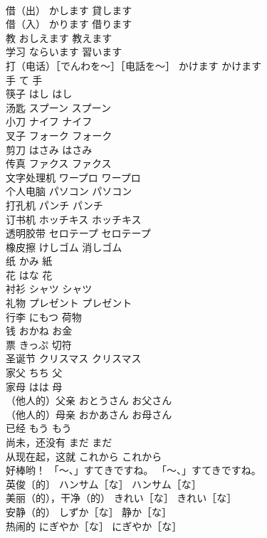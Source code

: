 \documentclass[8pt]{extreport}
\begin{document}
\begin{CJK}{UTF8}{min}
\\	借（出）	かします	貸します
\\	借（入）	かります	借ります
\\	教	おしえます	教えます
\\	学习	ならいます	習います
\\	打（电话）［でんわを～］［电話を～］	かけます	かけます
\\	手	て	手
\\	筷子	はし	はし
\\	汤匙	スプーン	スプーン
\\	小刀	ナイフ	ナイフ
\\	叉子	フォーク	フォーク
\\	剪刀	はさみ	はさみ
\\	传真	ファクス	ファクス
\\	文字处理机	ワープロ	ワープロ
\\	个人电脑	パソコン	パソコン
\\	打孔机	パンチ	パンチ
\\	订书机	ホッチキス	ホッチキス
\\	透明胶带	セロテープ	セロテープ
\\	橡皮擦	けしゴム	消しゴム
\\	纸	かみ	紙
\\	花	はな	花
\\	衬衫	シャツ	シャツ
\\	礼物	プレゼント	プレゼント
\\	行李	にもつ	荷物
\\	钱	おかね	お金
\\	票	きっぷ	切符
\\	圣诞节	クリスマス	クリスマス
\\	家父	ちち	父
\\	家母	はは	母
\\	（他人的）父亲	おとうさん	お父さん
\\	（他人的）母亲	おかあさん	お母さん
\\	已经	もう	もう
\\	尚未，还没有	まだ	まだ
\\	从现在起，这就	これから	これから
\\	好棒哟！	「～、」すてきですね。	「～、」すてきですね。
\\	英俊〔的〕	ハンサム［な］	ハンサム［な］
\\	美丽（的），干净（的）	きれい［な］	きれい［な］
\\	安静（的）	しずか［な］	静か［な］
\\	热闹的	にぎやか［な］	にぎやか［な］

\end{CJK}
\end{document}
